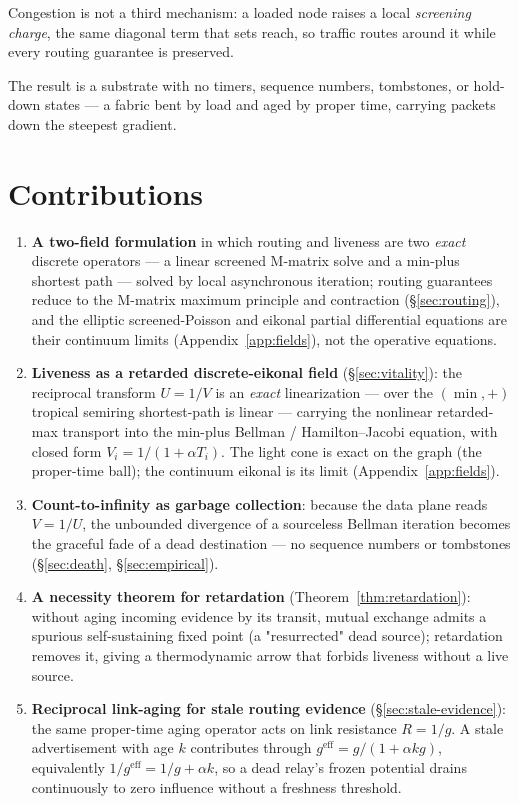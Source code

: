 \documentclass[11pt]{article}
\theoremstyle{plain}
\numberwithin{equation}{section}
\begin{document}
Congestion is not a third mechanism: a loaded node raises a local \emph{screening charge}, the same diagonal term that sets reach, so traffic routes around it while every routing guarantee is preserved.

The result is a substrate with no timers, sequence numbers, tombstones, or hold-down states — a fabric bent by load and aged by proper time, carrying packets down the steepest gradient.

\section{Contributions}\label{sec:contributions}

\begin{enumerate}
\item \textbf{A two-field formulation} in which routing and liveness are two \emph{exact} discrete operators — a linear screened M-matrix solve and a min-plus shortest path — solved by local asynchronous iteration; routing guarantees reduce to the M-matrix maximum principle and contraction (§\ref{sec:routing}), and the elliptic screened-Poisson and eikonal partial differential equations are their continuum limits (Appendix~\ref{app:fields}), not the operative equations.
\item \textbf{Liveness as a retarded discrete-eikonal field} (§\ref{sec:vitality}): the reciprocal transform $U=1/V$ is an \emph{exact} linearization — over the $(\min,+)$ tropical semiring shortest-path is linear — carrying the nonlinear retarded-max transport into the min-plus Bellman / Hamilton–Jacobi equation, with closed form $V_i=1/(1+\alpha T_i)$. The light cone is exact on the graph (the proper-time ball); the continuum eikonal is its limit (Appendix~\ref{app:fields}).
\item \textbf{Count-to-infinity as garbage collection}: because the data plane reads $V=1/U$, the unbounded divergence of a sourceless Bellman iteration becomes the graceful fade of a dead destination — no sequence numbers or tombstones (§\ref{sec:death}, §\ref{sec:empirical}).
\item \textbf{A necessity theorem for retardation} (Theorem~\ref{thm:retardation}): without aging incoming evidence by its transit, mutual exchange admits a spurious self-sustaining fixed point (a "resurrected" dead source); retardation removes it, giving a thermodynamic arrow that forbids liveness without a live source.
\item \textbf{Reciprocal link-aging for stale routing evidence} (§\ref{sec:stale-evidence}): the same proper-time aging operator acts on link resistance $R=1/g$. A stale advertisement with age $k$ contributes through $g^{\mathrm{eff}}=g/(1+\alpha k g)$, equivalently $1/g^{\mathrm{eff}}=1/g+\alpha k$, so a dead relay's frozen potential drains continuously to zero influence without a freshness threshold.

\end{enumerate}
\end{document}
